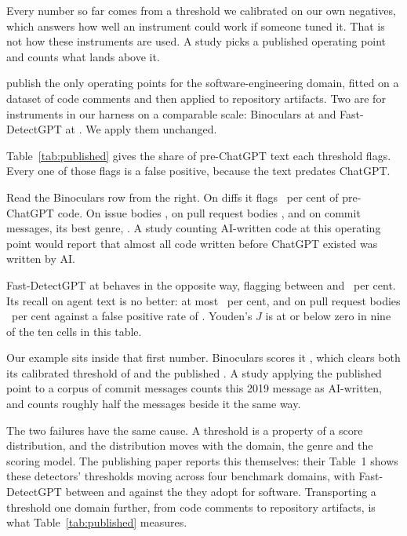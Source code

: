 Every number so far comes from a threshold we calibrated on our own negatives, which
answers how well an instrument could work if someone tuned it. That is not how these
instruments are used. A study picks a published operating point and counts what lands
above it.

\citet{ji2026exploratory} publish the only operating points for the software-engineering
domain, fitted on a dataset of code comments and then applied to repository artifacts.
Two are for instruments in our harness on a comparable scale: Binoculars at
 and Fast-DetectGPT at . We apply them unchanged.



Table~\ref{tab:published} gives the share of pre-ChatGPT text each threshold flags.
Every one of those flags is a false positive, because the text predates ChatGPT.

Read the Binoculars row from the right. On diffs it flags ~per cent of
pre-ChatGPT code. On issue bodies , on pull request bodies
, and on commit messages, its best genre, . A study
counting AI-written code at this operating point would report that almost all code
written before ChatGPT existed was written by AI.

Fast-DetectGPT at  behaves in the opposite way, flagging between
 and ~per cent. Its recall on agent text is no better: at
most ~per cent, and on pull request bodies ~per cent
against a false positive rate of . Youden's $J$ is at or below zero in
nine of the ten cells in this table.

Our example sits inside that first number. Binoculars scores it \ExBinocularsScore{},
which clears both its calibrated threshold of \ExBinocularsThreshold{} and the published
. A study applying the published point to a corpus of commit messages
counts this 2019 message as AI-written, and counts roughly half the messages beside it
the same way.

The two failures have the same cause. A threshold is a property of a score distribution,
and the distribution moves with the domain, the genre and the scoring model. The
publishing paper reports this themselves: their Table~1 shows these detectors'
thresholds moving across four benchmark domains, with Fast-DetectGPT between
 and  against the  they adopt for software.
Transporting a threshold one domain further, from code comments to repository artifacts,
is what Table~\ref{tab:published} measures.

